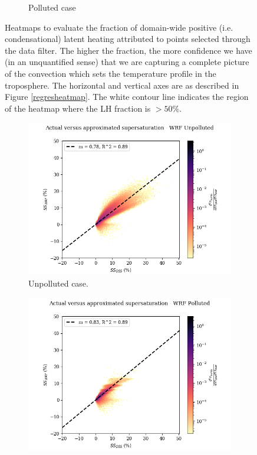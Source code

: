 \documentclass{article}
\begin{document}
\begin{figure}[ht]
\begin{subfigure}{0.7\textwidth}
		\caption{Polluted case}
		\label{lhheatmappoll}
	\end{subfigure}
	\caption{Heatmaps to evaluate the fraction of domain-wide positive (i.e. condensational) latent heating attributed to points selected through the data filter. The higher the fraction, the more confidence we have (in an unquantified sense) that we are capturing a complete picture of the convection which sets the temperature profile in the troposphere. The horizontal and vertical axes are as described in Figure \ref{regresheatmap}. The white contour line indicates the region of the heatmap where the LH fraction is $> 50\%$.}
	\label{lhheatmap}
\end{figure}

\begin{figure}[ht]
	\centering
	\begin{subfigure}{0.7\textwidth}
		\includegraphics[width=\textwidth]{revmywrf/v10_FINAL_heatmap_ss_qss_vs_ss_wrf_Unpolluted_figure.png}
		\caption{Unpolluted case.}
		\label{wrfvsqssunpoll}
	\end{subfigure}
	\begin{subfigure}{0.7\textwidth}
		\includegraphics[width=\textwidth]{revmywrf/v10_FINAL_heatmap_ss_qss_vs_ss_wrf_Polluted_figure.png}

\end{subfigure}
\end{figure}
\end{document}

